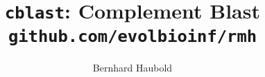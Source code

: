 \documentclass[a4paper]{article}
\begin{document}
\pagestyle{noweb}

\title{\texttt{cblast}: Complement Blast\\
\small\texttt{github.com/evolbioinf/rmh}}
\author{Bernhard Haubold}
\maketitle


% 
\end{document}
